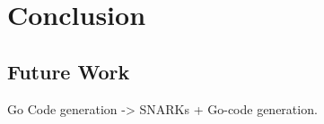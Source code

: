 \chapter{Conclusion}\label{chapter:conclusion}

\section{Future Work}
Go Code generation -> SNARKs + Go-code generation.